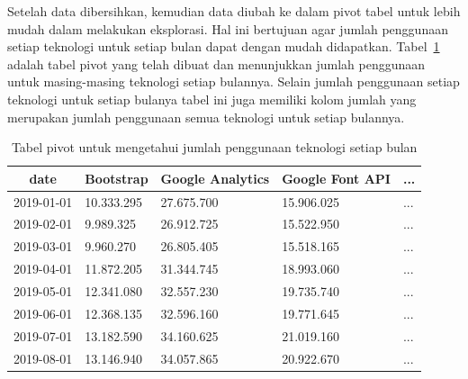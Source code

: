 Setelah data dibersihkan, kemudian data diubah ke dalam pivot tabel untuk lebih mudah dalam melakukan eksplorasi. Hal ini bertujuan agar jumlah penggunaan setiap teknologi untuk setiap bulan dapat dengan mudah didapatkan. Tabel~\ref{tab:tabelpivot} adalah tabel pivot yang telah dibuat dan menunjukkan jumlah penggunaan untuk masing-masing teknologi setiap bulannya. Selain jumlah penggunaan setiap teknologi untuk setiap bulanya tabel ini juga memiliki kolom jumlah yang merupakan jumlah penggunaan semua teknologi untuk setiap bulannya.

\begin{table}[H]
\centering
\caption{Tabel pivot untuk mengetahui jumlah penggunaan teknologi setiap bulan}
\label{tab:tabelpivot}
\begin{tabular}{lllll}
\hline
\multicolumn{1}{|c|}{date} & \multicolumn{1}{l|}{Bootstrap} & \multicolumn{1}{l|}{Google Analytics} & \multicolumn{1}{l|}{Google Font API} & \multicolumn{1}{l|}{...} \\ \hline
\multicolumn{1}{|l|}{2019-01-01} & \multicolumn{1}{l|}{10.333.295} & \multicolumn{1}{l|}{27.675.700} & \multicolumn{1}{l|}{15.906.025} & \multicolumn{1}{l|}{...} \\ \hline
\multicolumn{1}{|l|}{2019-02-01} & \multicolumn{1}{l|}{9.989.325} & \multicolumn{1}{l|}{26.912.725} & \multicolumn{1}{l|}{15.522.950} & \multicolumn{1}{l|}{...} \\ \hline
\multicolumn{1}{|l|}{2019-03-01} & \multicolumn{1}{l|}{9.960.270} & \multicolumn{1}{l|}{26.805.405} & \multicolumn{1}{l|}{15.518.165} & \multicolumn{1}{l|}{...} \\ \hline
\multicolumn{1}{|l|}{2019-04-01} & \multicolumn{1}{l|}{11.872.205} & \multicolumn{1}{l|}{31.344.745} & \multicolumn{1}{l|}{18.993.060} & \multicolumn{1}{l|}{...} \\ \hline
\multicolumn{1}{|l|}{2019-05-01} & \multicolumn{1}{l|}{12.341.080} & \multicolumn{1}{l|}{32.557.230} & \multicolumn{1}{l|}{19.735.740} & \multicolumn{1}{l|}{...} \\ \hline
\multicolumn{1}{|l|}{2019-06-01} & \multicolumn{1}{l|}{12.368.135} & \multicolumn{1}{l|}{32.596.160} & \multicolumn{1}{l|}{19.771.645} & \multicolumn{1}{l|}{...} \\ \hline
\multicolumn{1}{|l|}{2019-07-01} & \multicolumn{1}{l|}{13.182.590} & \multicolumn{1}{l|}{34.160.625} & \multicolumn{1}{l|}{21.019.160} & \multicolumn{1}{l|}{...} \\ \hline
\multicolumn{1}{|l|}{2019-08-01} & \multicolumn{1}{l|}{13.146.940} & \multicolumn{1}{l|}{34.057.865} & \multicolumn{1}{l|}{20.922.670} & \multicolumn{1}{l|}{...} \\ \hline

\end{tabular}
\end{table}
